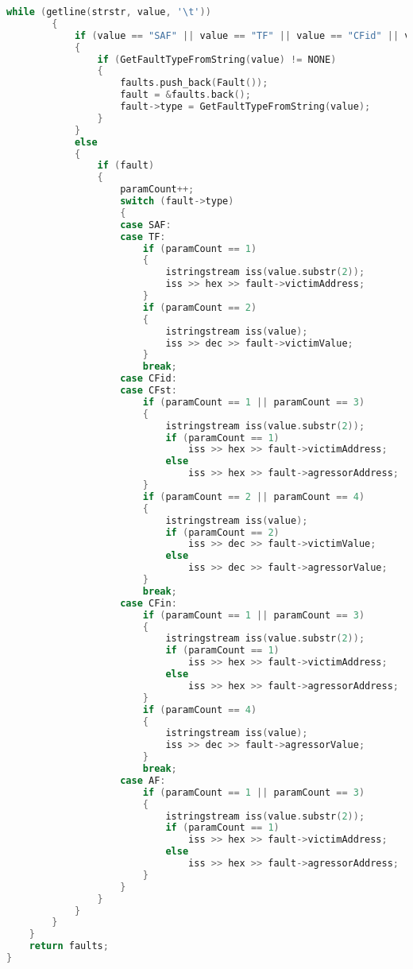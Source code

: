 \begin{lstlisting}[language=C++, style=cplusplusstyle]
		while (getline(strstr, value, '\t'))
		{
			if (value == "SAF" || value == "TF" || value == "CFid" || value == "CFin" || value == "CFst" || value == "AF")
			{
				if (GetFaultTypeFromString(value) != NONE)
				{
					faults.push_back(Fault());
					fault = &faults.back();
					fault->type = GetFaultTypeFromString(value);
				}
			}
			else
			{
				if (fault)
				{
					paramCount++;
					switch (fault->type)
					{
					case SAF:
					case TF:
						if (paramCount == 1)
						{
							istringstream iss(value.substr(2));
							iss >> hex >> fault->victimAddress;
						}
						if (paramCount == 2)
						{
							istringstream iss(value);
							iss >> dec >> fault->victimValue;
						}
						break;
					case CFid:
					case CFst:
						if (paramCount == 1 || paramCount == 3)
						{
							istringstream iss(value.substr(2));
							if (paramCount == 1)
								iss >> hex >> fault->victimAddress;
							else
								iss >> hex >> fault->agressorAddress;
						}
						if (paramCount == 2 || paramCount == 4)
						{
							istringstream iss(value);
							if (paramCount == 2)
								iss >> dec >> fault->victimValue;
							else
								iss >> dec >> fault->agressorValue;
						}
						break;
					case CFin:
						if (paramCount == 1 || paramCount == 3)
						{
							istringstream iss(value.substr(2));
							if (paramCount == 1)
								iss >> hex >> fault->victimAddress;
							else
								iss >> hex >> fault->agressorAddress;
						}
						if (paramCount == 4)
						{
							istringstream iss(value);
							iss >> dec >> fault->agressorValue;
						}
						break;
					case AF:
						if (paramCount == 1 || paramCount == 3)
						{
							istringstream iss(value.substr(2));
							if (paramCount == 1)
								iss >> hex >> fault->victimAddress;
							else
								iss >> hex >> fault->agressorAddress;
						}
					}
				}
			}
		}
	}
	return faults;
}
\end{lstlisting}
